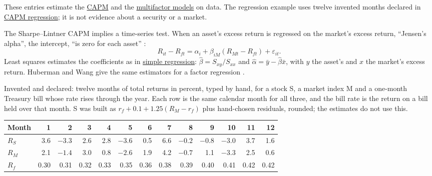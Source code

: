 These entries estimate the \hyperref[mod:capm-sml]{CAPM} and the \hyperref[mod:multifactor-apt]{multifactor models} on data. The regression example uses twelve invented months declared in \hyperref[meth:capm-regression]{CAPM regression}; it is not evidence about a security or a market.

\begin{qfmethod}\label{meth:capm-regression}
 The Sharpe--Lintner CAPM implies a time-series test. When an asset's excess return is regressed on the market's excess return, ``Jensen's alpha'', the intercept, ``is zero for each asset'' \citep[\emph{JEP} 18(3), 2004, p.~32]{capm-theory-evidence-2004}:
\[ R_{it}-R_{ft}=\alpha_i+\beta_{iM}(R_{Mt}-R_{ft})+\varepsilon_{it}. \] Least squares estimates the coefficients as in \hyperref[meth:simple-regression-estimation]{simple regression}: $\hat\beta=S_{xy}/S_{xx}$ and $\hat\alpha=\bar y-\hat\beta\bar x$, with $y$ the asset's and $x$ the market's excess return. Huberman and Wang give the same estimators for a factor regression \citep[FRBNY Staff Report 216, August 2005, sec.~7, eqs.~(14)--(17)]{arbitrage-pricing-review-2005}.

 Invented and declared: twelve months of total returns in percent, typed by hand, for a stock S, a market index M and a one-month Treasury bill whose rate rises through the year. Each row is the same calendar month for all three, and the bill rate is the return on a bill held over that month. S was built as $r_f+0.1+1.25(R_M-r_f)$ plus hand-chosen residuals, rounded; the estimates do not use this.

\begin{center}\small
\begin{tabular}{@{}lrrrrrrrrrrrr@{}}
\toprule
Month & 1 & 2 & 3 & 4 & 5 & 6 & 7 & 8 & 9 & 10 & 11 & 12 \\
\midrule
$R_S$ & 3.6 & $-3.3$ & 2.6 & 2.8 & $-3.6$ & 0.5 & 6.6 & $-0.2$ & $-0.8$ & $-3.0$ & 3.7 & 1.6 \\
$R_M$ & 2.1 & $-1.4$ & 3.0 & 0.8 & $-2.6$ & 1.9 & 4.2 & $-0.7$ & 1.1 & $-3.3$ & 2.5 & 0.6 \\
$R_f$ & 0.30 & 0.31 & 0.32 & 0.33 & 0.35 & 0.36 & 0.38 & 0.39 & 0.40 & 0.41 & 0.42 & 0.42 \\
\bottomrule
\end{tabular}
\end{center}


\end{qfmethod}
